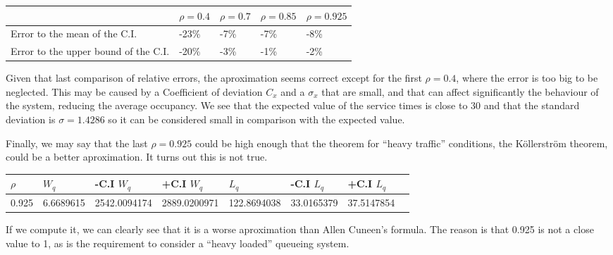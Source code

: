 \documentclass[]{article}
\begin{document}
\begin{longtable}[]{@{}lllll@{}}
\toprule
& \(\rho=0.4\) & \(\rho=0.7\) & \(\rho=0.85\) &
\(\rho=0.925\)\tabularnewline
\midrule
\endhead
Error to the mean of the C.I. & -23\% & -7\% & -7\% &
-8\%\tabularnewline
Error to the upper bound of the C.I. & -20\% & -3\% & -1\% &
-2\%\tabularnewline
\bottomrule
\end{longtable}

Given that last comparison of relative errors, the aproximation seems
correct except for the first \(\rho=0.4\), where the error is too big to
be neglected. This may be caused by a Coefficient of deviation \(C_{x}\)
and a \(\sigma_{x}\) that are small, and that can affect significantly
the behaviour of the system, reducing the average occupancy. We see that
the expected value of the service times is close to 30 and that the
standard deviation is \(\sigma=1.4286\) so it can be considered small in
comparison with the expected value.

Finally, we may say that the last \(\rho=0.925\) could be high enough
that the theorem for ``heavy traffic'' conditions, the Köllerström
theorem, could be a better aproximation. It turns out this is not true.

\begin{longtable}[]{@{}llllllll@{}}
\toprule
\(\rho\) & \(W_{q}\) & -C.I \(W_{q}\) & +C.I \(W_{q}\) & \(L_{q}\) &
-C.I \(L_{q}\) & +C.I \(L_{q}\) &\tabularnewline
\midrule
\endhead
0.925 & 6.6689615 & 2542.0094174 & 2889.0200971 & 122.8694038 &
33.0165379 & 37.5147854\tabularnewline
\bottomrule
\end{longtable}

If we compute it, we can clearly see that it is a worse aproximation
than Allen Cuneen's formula. The reason is that 0.925 is not a close
value to 1, as is the requirement to consider a ``heavy loaded''
queueing system.
\end{document}
